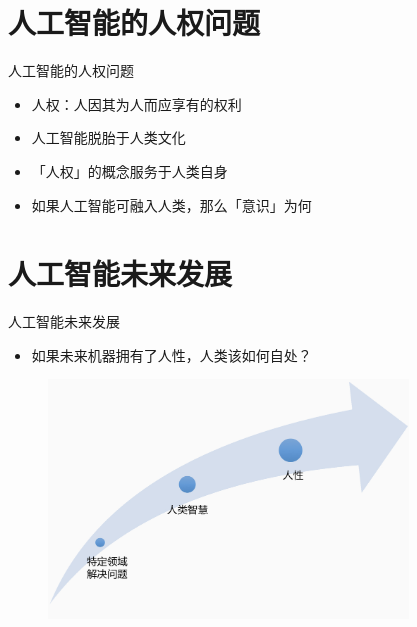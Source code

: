 \documentclass{beamer}
\begin{document}
  \section{人工智能的人权问题}
  \begin{frame}{人工智能的人权问题}
    \begin{itemize}
     \item 人权：人因其为人而应享有的权利
     \item 人工智能脱胎于人类文化
     \item 「人权」的概念服务于人类自身  
     \item 如果人工智能可融入人类，那么「意识」为何
    \end{itemize}
  \end{frame}

  \section{人工智能未来发展}

  \begin{frame}{人工智能未来发展}
    \begin{itemize}
     \item  如果未来机器拥有了人性，人类该如何自处？
    \end{itemize}
   \begin{figure}[H]
   \centering
   \includegraphics[height=2.5in]{cdjPic1.jpg}
   \end{figure}
  \end{frame}
  
\end{document}
